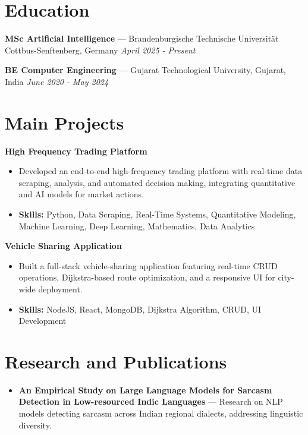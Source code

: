 \documentclass[a4paper,10pt]{article}
\begin{document}
\section*{Education}
\textbf{MSc Artificial Intelligence} — Brandenburgische Technische Universität Cottbus-Senftenberg, Germany \hfill \textit{April 2025 - Present}\par
\vspace{1.5pt}
\textbf{BE Computer Engineering} — Gujarat Technological University, Gujarat, India \hfill \textit{June 2020 - May 2024}\par

\section*{Main Projects}
\textbf{High Frequency Trading Platform}\par
\vspace{1pt}
\begin{itemize}
  \item Developed an end-to-end high-frequency trading platform with real-time data scraping, analysis, and automated decision making, integrating quantitative and AI models for market actions.
  \item \textbf{Skills:} Python, Data Scraping, Real-Time Systems, Quantitative Modeling, Machine Learning, Deep Learning, Mathematics, Data Analytics
\end{itemize}
\vspace{3pt}
\textbf{Vehicle Sharing Application}\par
\vspace{1pt}
\begin{itemize}
  \item Built a full-stack vehicle-sharing application featuring real-time CRUD operations, Dijkstra-based route optimization, and a responsive UI for city-wide deployment.
  \item \textbf{Skills:} NodeJS, React, MongoDB, Dijkstra Algorithm, CRUD, UI Development
\end{itemize}

\section*{Research and Publications}
\begin{itemize}
\item \textbf{An Empirical Study on Large Language Models for Sarcasm Detection in Low-resourced Indic Languages} — Research on NLP models detecting sarcasm across Indian regional dialects, addressing linguistic diversity.
\end{itemize}
\end{document}
